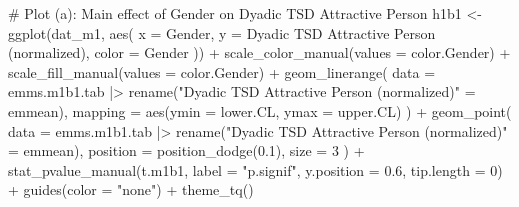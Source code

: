 \documentclass[
  bookmarksnumbered]{article}
\newenvironment{Shaded}{\begin{snugshade}}{\end{snugshade}}
\newcommand{\AttributeTok}[1]{\textcolor[rgb]{0.80,0.80,0.80}{#1}}
\newcommand{\CommentTok}[1]{\textcolor[rgb]{0.50,0.62,0.50}{#1}}
\newcommand{\DecValTok}[1]{\textcolor[rgb]{0.86,0.86,0.80}{#1}}
\newcommand{\FloatTok}[1]{\textcolor[rgb]{0.75,0.75,0.82}{#1}}
\newcommand{\FunctionTok}[1]{\textcolor[rgb]{0.94,0.94,0.56}{#1}}
\newcommand{\NormalTok}[1]{\textcolor[rgb]{0.80,0.80,0.80}{#1}}
\newcommand{\OtherTok}[1]{\textcolor[rgb]{0.94,0.94,0.56}{#1}}
\newcommand{\SpecialCharTok}[1]{\textcolor[rgb]{0.86,0.64,0.64}{#1}}
\newcommand{\StringTok}[1]{\textcolor[rgb]{0.80,0.58,0.58}{#1}}
\begin{document}
\begin{Shaded}
\begin{Highlighting}[]
\CommentTok{\# Plot (a): Main effect of Gender on Dyadic TSD Attractive Person}
\NormalTok{h1b1 }\OtherTok{\textless{}{-}} \FunctionTok{ggplot}\NormalTok{(dat\_m1, }\FunctionTok{aes}\NormalTok{(}
  \AttributeTok{x =}\NormalTok{ Gender, }\AttributeTok{y =} \StringTok{\textasciigrave{}}\AttributeTok{Dyadic TSD Attractive Person (normalized)}\StringTok{\textasciigrave{}}\NormalTok{, }\AttributeTok{color =}\NormalTok{ Gender}
\NormalTok{)) }\SpecialCharTok{+}
  \FunctionTok{scale\_color\_manual}\NormalTok{(}\AttributeTok{values =}\NormalTok{ color.Gender) }\SpecialCharTok{+}
  \FunctionTok{scale\_fill\_manual}\NormalTok{(}\AttributeTok{values =}\NormalTok{ color.Gender) }\SpecialCharTok{+}
  \FunctionTok{geom\_linerange}\NormalTok{(}
    \AttributeTok{data =}\NormalTok{ emms.m1b1.tab }\SpecialCharTok{|\textgreater{}} \FunctionTok{rename}\NormalTok{(}\StringTok{"Dyadic TSD Attractive Person (normalized)"} \OtherTok{=}\NormalTok{ emmean),}
    \AttributeTok{mapping =} \FunctionTok{aes}\NormalTok{(}\AttributeTok{ymin =}\NormalTok{ lower.CL, }\AttributeTok{ymax =}\NormalTok{ upper.CL)}
\NormalTok{  ) }\SpecialCharTok{+}
  \FunctionTok{geom\_point}\NormalTok{(}
    \AttributeTok{data =}\NormalTok{ emms.m1b1.tab }\SpecialCharTok{|\textgreater{}} \FunctionTok{rename}\NormalTok{(}\StringTok{"Dyadic TSD Attractive Person (normalized)"} \OtherTok{=}\NormalTok{ emmean),}
    \AttributeTok{position =} \FunctionTok{position\_dodge}\NormalTok{(}\FloatTok{0.1}\NormalTok{), }\AttributeTok{size =} \DecValTok{3}
\NormalTok{  ) }\SpecialCharTok{+}
  \FunctionTok{stat\_pvalue\_manual}\NormalTok{(t.m1b1, }\AttributeTok{label =} \StringTok{"p.signif"}\NormalTok{, }\AttributeTok{y.position =} \FloatTok{0.6}\NormalTok{, }\AttributeTok{tip.length =} \DecValTok{0}\NormalTok{) }\SpecialCharTok{+}
  \FunctionTok{guides}\NormalTok{(}\AttributeTok{color =} \StringTok{"none"}\NormalTok{) }\SpecialCharTok{+}
  \FunctionTok{theme\_tq}\NormalTok{()}


\end{Highlighting}
\end{Shaded}
\end{document}
